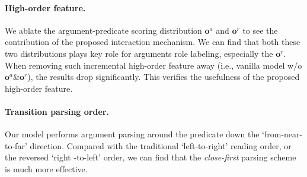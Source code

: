 \documentclass[letterpaper]{article} %
\begin{document}
\begin{CJK}{UTF8}{gbsn}
\paragraph{High-order feature.}
We ablate the argument-predicate scoring distribution $\bm{o}^a$ and $\bm{o}^r$ to see the contribution of the proposed interaction mechanism.
We can find that both these two distributions plays key role for arguments role labeling, especially the $\bm{o}^r$.
When removing such incremental high-order feature away (i.e., vanilla model w/o $\bm{o}^a$\&$\bm{o}^r$), the results drop significantly.
This verifies the usefulness of the proposed high-order feature.


\paragraph{Transition parsing order.}
Our model performs argument parsing around the predicate down the `from-near-to-far' direction.
Compared with the traditional `left-to-right' reading order, or the reversed `right -to-left' order, we can find that the \emph{close-first} parsing scheme is much more effective.










\begin{table*}[!t]
\begin{center}
\end{center}
\caption{
End-to-end SRL on UPB data.
Values are F1 scores for argument recognition and role labeling.
}
\label{UPB}
\end{table*}











\end{CJK}
\end{document}
